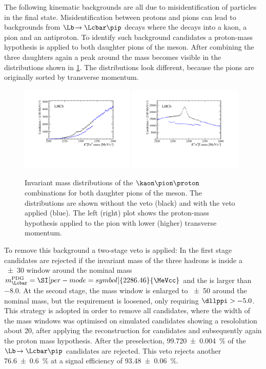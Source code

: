 The following kinematic backgrounds are all due to misidentification of particles in the final state.
Misidentification between protons and pions can lead to backgrounds from $\Lb\!\to\Lcbar\pip$ decays where the \Lcbar decays into a kaon, a pion and an antiproton.
To identify such background candidates a proton-mass hypothesis is applied to both daughter pions of the \Dm meson.
After combining the three \D daughters again a peak around the \Lc mass becomes visible in the distributions shown in \cref{fig:LcVeto}.
The distributions look different, because the pions are originally sorted by transverse momentum.
\begin{figure}[tbp]
    \centering
    \includegraphics[width=0.485\textwidth]{07selection/figs/LcHypo1.pdf}
    \includegraphics[width=0.485\textwidth]{07selection/figs/LcHypo2.pdf}
    \caption{Invariant mass distributions of the $\kaon\pion\proton$ combinations for both daughter pions of the \Dm meson.
    The distributions are shown without the veto (black) and with the veto applied (blue).
    The left (right) plot shows the proton-mass hypothesis applied to the pion with lower (higher) transverse momentum.}
    \label{fig:LcVeto}
\end{figure}
To remove this background a two-stage veto is applied: In the first stage candidates are rejected if the invariant mass of the three hadrons is inside a \SI[per-mode=symbol]{\pm30}{\MeVcc}  window around the nominal \mbox{\Lcbar mass} $m_\Lcbar^{\text{PDG}}=\SI[per-mode=symbol]{2286.46}{\MeVcc}$ and the \dllppi is larger than \num{-8.0}.
At the second stage, the mass window is enlarged to \SI[per-mode=symbol]{\pm50}{\MeVcc} around the nominal \Lcbar mass, but the \dllppi requirement is loosened, only requiring $\dllppi>-5.0$.
This strategy is adopted in order to remove all \Lcbar candidates, where the width of the mass windows was optimised on simulated \Lcbar candidates showing a resololution about \SI[per-mode=symbol]{20}{\MeVcc}, after applying the reconstruction for \BdToDpi candidates and subsequently again the proton mass hypothesis.
After the preselection, \SI{99.720\pm0.004}{\percent} of the $\Lb\!\to\Lcbar\pip$ candidates are rejected.
This veto rejects another \SI{76.6\pm0.6}{\percent} at a signal efficiency of \SI{93.48\pm0.06}{\percent}.

